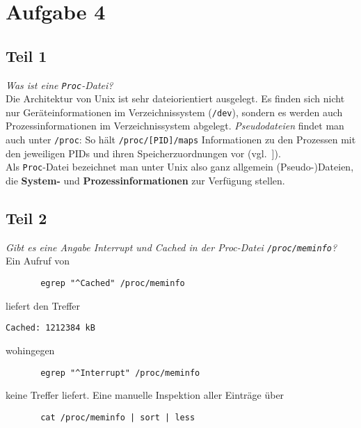 \chapter{Aufgabe 4}

\section{Teil 1}

\textit{Was ist eine \texttt{Proc}-Datei?}\\

\noindent
Die Architektur von Unix ist sehr dateiorientiert ausgelegt.
Es finden sich nicht nur Geräteinformationen im Verzeichnissystem (\texttt{/dev}), sondern es werden auch Prozessinformationen im Verzeichnissystem abgelegt.
\textit{Pseudodateien} findet man auch unter \texttt{/proc}: So hält \texttt{/proc/[PID]/maps} Informationen zu den Prozessen mit den jeweiligen PIDs und ihren Speicherzuordnungen vor (vgl.~\cite[103]{ES4}]).\\

\noindent
Als \texttt{Proc}-Datei bezeichnet man unter Unix also ganz allgemein (Pseudo-)Dateien, die \textbf{System-} und \textbf{Prozessinformationen} zur Verfügung stellen.

\section{Teil 2}

\textit{Gibt es eine Angabe Interrupt und Cached in der Proc-Datei \texttt{/proc/meminfo}?}\\

\noindent
Ein Aufruf von

\begin{verbatim}
       egrep "^Cached" /proc/meminfo
\end{verbatim}

\noindent
liefert den Treffer


\begin{center}
    \texttt{Cached:          1212384 kB}
\end{center}

\noindent
wohingegen

\begin{verbatim}
       egrep "^Interrupt" /proc/meminfo
\end{verbatim}

\noindent
keine Treffer liefert.
Eine manuelle Inspektion aller Einträge über

\begin{verbatim}
       cat /proc/meminfo | sort | less
\end{verbatim}


